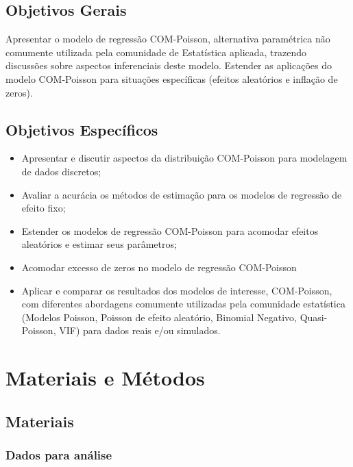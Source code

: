 \documentclass[
	12pt,				%
	openright,			%
	oneside,			%
	a4paper,			%
	english,			%
	brazil,				%
	]{abntex2}
\begin{document}
\section{Objetivos Gerais}

Apresentar o modelo de regressão COM-Poisson, alternativa 
paramétrica não comumente utilizada pela comunidade de 
Estatística aplicada, trazendo discussões sobre aspectos 
inferenciais deste modelo. Estender as aplicações do modelo
COM-Poisson para situações específicas (efeitos aleatórios 
e inflação de zeros).

\section{Objetivos Específicos}

\begin{itemize}
	\item Apresentar e discutir aspectos da distribuição 
	COM-Poisson para modelagem de dados discretos;
	
	\item Avaliar a acurácia os métodos de estimação para 
	os modelos de regressão de efeito fixo;
	
	\item Estender os modelos de regressão COM-Poisson para 
	acomodar efeitos aleatórios e estimar seus parâmetros;
	
	\item Acomodar excesso de zeros no modelo de regressão 
	COM-Poisson
	
	\item Aplicar e comparar os resultados dos modelos de 
	interesse, COM-Poisson, com diferentes abordagens 
	comumente utilizadas pela comunidade estatística 
	(Modelos Poisson, Poisson de efeito aleatório, Binomial
	Negativo, Quasi-Poisson, VIF) para dados reais e/ou 
	simulados.
\end{itemize}

\chapter{Materiais e Métodos}
\section{Materiais}

\subsection{Dados para análise}
\end{document}
